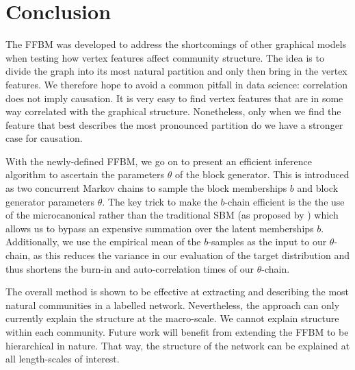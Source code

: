 \section{Conclusion}
\label{sec:conclusion}

The FFBM was developed to address the shortcomings of other graphical models when testing how vertex features affect community structure. The idea is to divide the graph into its most natural partition and only then bring in the vertex features. We therefore hope to avoid a common pitfall in data science: correlation does not imply causation. It is very easy to find vertex features that are in some way correlated with the graphical structure. Nonetheless, only when we find the feature that best describes the most pronounced partition do we have a stronger case for causation.

With the newly-defined FFBM, we go on to present an efficient inference algorithm to ascertain the parameters $\theta$ of the block generator. This is introduced as two concurrent Markov chains to sample the block memberships $b$ and block generator parameters $\theta$. The key trick to make the $b$-chain efficient is the the use of the microcanonical rather than the traditional SBM (as proposed by \citet{Peixoto-Bayesian-Microcanonical}) which allows us to bypass an expensive summation over the latent memberships $b$. Additionally, we use the empirical mean of the $b$-samples as the input to our $\theta$-chain, as this reduces the variance in our evaluation of the target distribution and thus shortens the burn-in and auto-correlation times of our $\theta$-chain.

The overall method is shown to be effective at extracting and describing the most natural communities in a labelled network. Nevertheless, the approach can only currently explain the structure at the macro-scale. We cannot explain structure within each community. Future work will benefit from extending the FFBM to be hierarchical in nature. That way, the structure of the network can be explained at all length-scales of interest.